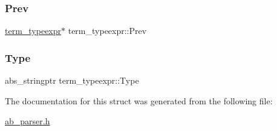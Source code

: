 \subsubsection{\texorpdfstring{Prev}{Prev}}
{\footnotesize\ttfamily \hyperlink{structterm__typeexpr}{term\+\_\+typeexpr}$\ast$ term\+\_\+typeexpr\+::\+Prev}

\mbox{\label{structterm__typeexpr_ae05c0a936f42e129b697dc57ae803e0e}} 
\subsubsection{\texorpdfstring{Type}{Type}}
{\footnotesize\ttfamily abs\+\_\+stringptr term\+\_\+typeexpr\+::\+Type}



The documentation for this struct was generated from the following file\+:\begin{DoxyCompactItemize}
\item 
\hyperlink{ab__parser_8h}{ab\+\_\+parser.\+h}\end{DoxyCompactItemize}
